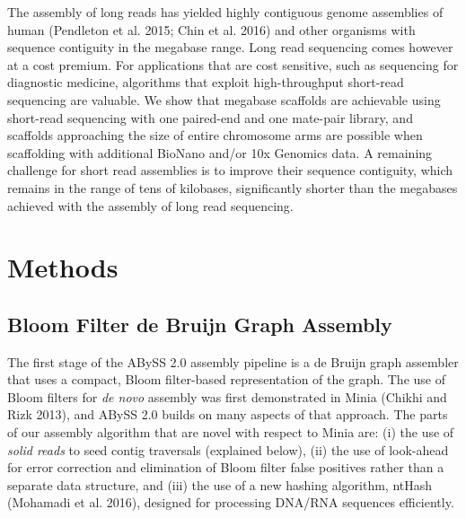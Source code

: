 \documentclass[
  12pt,
  oneside,
  openany]{book}
\begin{document}
The assembly of long reads has yielded highly contiguous genome assemblies of human (Pendleton et al. 2015; Chin et al. 2016) and other organisms with sequence contiguity in the megabase range. Long read sequencing comes however at a cost premium. For applications that are cost sensitive, such as sequencing for diagnostic medicine, algorithms that exploit high-throughput short-read sequencing are valuable. We show that megabase scaffolds are achievable using short-read sequencing with one paired-end and one mate-pair library, and scaffolds approaching the size of entire chromosome arms are possible when scaffolding with additional BioNano and/or 10x Genomics data. A remaining challenge for short read assemblies is to improve their sequence contiguity, which remains in the range of tens of kilobases, significantly shorter than the megabases achieved with the assembly of long read sequencing.

\hypertarget{methods}{%
\section{Methods}\label{methods}}

\hypertarget{bloom-filter-de-bruijn-graph-assembly}{%
\subsection{Bloom Filter de Bruijn Graph Assembly}\label{bloom-filter-de-bruijn-graph-assembly}}

The first stage of the ABySS 2.0 assembly pipeline is a de Bruijn graph assembler that uses a compact, Bloom filter-based representation of the graph. The use of Bloom filters for \emph{de novo} assembly was first demonstrated in Minia (Chikhi and Rizk 2013), and ABySS 2.0 builds on many aspects of that approach. The parts of our assembly algorithm that are novel with respect to Minia are: (i) the use of \emph{solid reads} to seed contig traversals (explained below), (ii) the use of look-ahead for error correction and elimination of Bloom filter false positives rather than a separate data structure, and (iii) the use of a new hashing algorithm, ntHash (Mohamadi et al. 2016), designed for processing DNA/RNA sequences efficiently.
\end{document}
